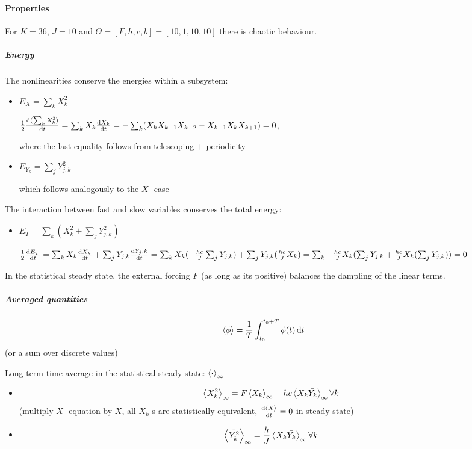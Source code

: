 \documentclass[11pt]{article}
\begin{document}
\paragraph{Properties}
\label{sec:orgec56c42}

For \(K=36\), \(J=10\) and \(\Theta = [F, h, c, b] = [10, 1, 10, 10]\) there is chaotic behaviour.

\subparagraph{Energy}
\label{sec:orgf5fbc14}

The nonlinearities conserve the energies within a subsystem:
\begin{itemize}
\item \(E_X = \sum_k X_k^2\)

\(\frac{1}{2} \dv{(\sum_k X_k^2)}{t} =
         \sum_k X_k \dv{X_k}{t} =
         -\sum_k (X_k X_{k-1} X_{k-2} - X_{k-1} X_{k} X_{k+1}) =
         0\),

where the last equality follows from telescoping + periodicity
\item \(E_{Y_k} = \sum_j Y_{j,k}^2\)

which follows analogously to the \(X\) -case
\end{itemize}

The interaction between fast and slow variables conserves the total energy:
\begin{itemize}
\item \(E_{T} = \sum_k (X_k^2 + \sum_j Y_{j,k}^2)\)

\(\frac{1}{2} \dv{E_{T}}{t} =
         \sum_k X_k \dv{X_k}{t} + \sum_j Y_{j,k} \dv{Y_j,k}{t} =
         \sum_k X_k (- \frac{hc}{J} \sum_j Y_{j,k}) + \sum_j Y_{j,k} (\frac{hc}{J} X_k) =
         \sum_k - \frac{hc}{J} X_k (\sum_j Y_{j,k} + \frac{hc}{J} X_k (\sum_j Y_{j,k})) = 
         0\)
\end{itemize}

In the statistical steady state, the external forcing \(F\) (as long as its positive) balances
the dampling of the linear terms.

\subparagraph{Averaged quantities}
\label{sec:org88ae285}

$$\expval{\phi} = \frac{1}{T} \int_{t_0}^{t_0 + T} \phi(t) \dd{t}$$ (or a sum over discrete values)

Long-term time-average in the statistical steady state: \(\expval{\cdot}_{\infty}\)

\begin{itemize}
\item \begin{equation}
\label{eqn:equilibrium_X}
   \expval{X_k^2}_\infty = F \expval{X_k}_{\infty} - hc \expval{X_k\bar{Y_k}}_\infty \forall k
\end{equation}
(multiply \(X\) -equation by \(X\), all \(X_k\) s are statistically equivalent, \(\dv{\expval{X}}{t} = 0\) in steady state)
\item \begin{equation}
\label{eqn:equilibrium_Y}
  \expval{\bar{Y_k^2}}_{\infty} = \frac{h}{J} \expval{X_k \bar{Y_k}}_{\infty} \forall k
\end{equation}
\end{itemize}
\end{document}
